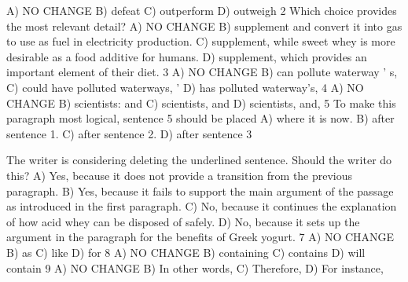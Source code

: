 A) NO CHANGE
B) defeat
C) outperform
D) outweigh
2
Which choice provides the most relevant detail?
A) NO CHANGE
B) supplement and convert it into gas to use as fuel
in electricity production.
C) supplement, while sweet whey is more desirable
as a food additive for humans.
D) supplement, which provides an important
element of their diet.
3
A) NO CHANGE
B) can pollute waterway ’ s,
C) could have polluted waterways,
’
D) has polluted waterway’s,
4
A) NO CHANGE
B) scientists: and
C) scientists, and
D) scientists, and,
5
To make this paragraph most logical, sentence 5
should be placed
A) where it is now.
B) after sentence 1.
C) after sentence 2.
D) after sentence 3


The writer is considering deleting the underlined
sentence. Should the writer do this?
A) Yes, because it does not provide a transition
from the previous paragraph.
B) Yes, because it fails to support the main
argument of the passage as introduced in the
first paragraph.
C) No, because it continues the explanation of how
acid whey can be disposed of safely.
D) No, because it sets up the argument in the
paragraph for the benefits of Greek yogurt.
7
A) NO CHANGE
B) as
C) like
D) for
8
A) NO CHANGE
B) containing
C) contains
D) will contain
9
A) NO CHANGE
B) In other words,
C) Therefore,
D) For instance,





\endinput


